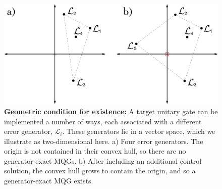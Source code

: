 \documentclass[aps,nofootinbib,pra,notitlepage,twocolumn]{revtex4-1}
\newcommand{\genmat}{\ensuremath{{\mathcal{L}}}}
\newcommand{\0}{\ensuremath{\mathbf{0}}}
\begin{document}
\begin{figure}
  \centering
  \includegraphics[width=\columnwidth]{vectorspace.pdf}
  \caption{\textbf{Geometric condition for existence:} A target unitary gate can be implemented a number of ways, each associated with a different error generator, $\genmat_i$. These generators lie in a vector space, which we illustrate as two-dimensional here. a) Four error generators. The origin is not contained in their convex hull, so there are no generator-exact MQGs. b) After including an additional control solution, the convex hull grows to contain the origin, and so a generator-exact MQG exists. }
  \label{fig:vectorspace}
\end{figure}
\end{document}
